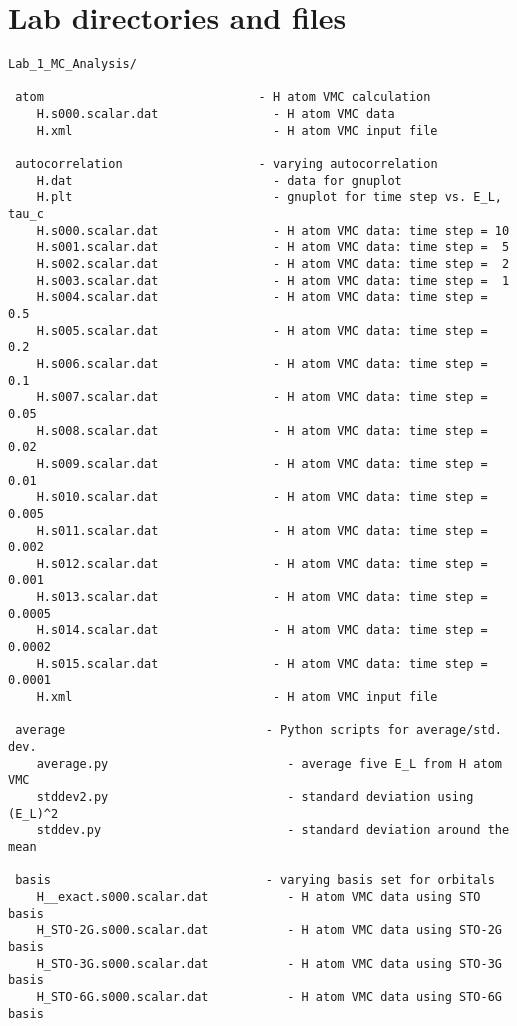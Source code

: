 \section{Lab directories and files}

\begin{shaded} 
\begin{verbatim}
Lab_1_MC_Analysis/

 atom                              - H atom VMC calculation
    H.s000.scalar.dat                - H atom VMC data 
    H.xml                            - H atom VMC input file

 autocorrelation                   - varying autocorrelation
    H.dat                            - data for gnuplot
    H.plt                            - gnuplot for time step vs. E_L, tau_c
    H.s000.scalar.dat                - H atom VMC data: time step = 10 
    H.s001.scalar.dat                - H atom VMC data: time step =  5 
    H.s002.scalar.dat                - H atom VMC data: time step =  2 
    H.s003.scalar.dat                - H atom VMC data: time step =  1 
    H.s004.scalar.dat                - H atom VMC data: time step =  0.5
    H.s005.scalar.dat                - H atom VMC data: time step =  0.2
    H.s006.scalar.dat                - H atom VMC data: time step =  0.1
    H.s007.scalar.dat                - H atom VMC data: time step =  0.05 
    H.s008.scalar.dat                - H atom VMC data: time step =  0.02
    H.s009.scalar.dat                - H atom VMC data: time step =  0.01
    H.s010.scalar.dat                - H atom VMC data: time step =  0.005
    H.s011.scalar.dat                - H atom VMC data: time step =  0.002
    H.s012.scalar.dat                - H atom VMC data: time step =  0.001
    H.s013.scalar.dat                - H atom VMC data: time step =  0.0005
    H.s014.scalar.dat                - H atom VMC data: time step =  0.0002
    H.s015.scalar.dat                - H atom VMC data: time step =  0.0001
    H.xml                            - H atom VMC input file

 average                            - Python scripts for average/std. dev.
    average.py                         - average five E_L from H atom VMC
    stddev2.py                         - standard deviation using (E_L)^2
    stddev.py                          - standard deviation around the mean

 basis                              - varying basis set for orbitals
    H__exact.s000.scalar.dat           - H atom VMC data using STO basis
    H_STO-2G.s000.scalar.dat           - H atom VMC data using STO-2G basis
    H_STO-3G.s000.scalar.dat           - H atom VMC data using STO-3G basis
    H_STO-6G.s000.scalar.dat           - H atom VMC data using STO-6G basis


\end{verbatim}
\end{shaded}

